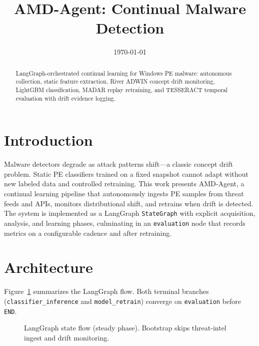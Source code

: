 \documentclass[11pt]{article}
\title{AMD-Agent: Continual Malware Detection}
\author{}
\date{\today}
\begin{document}
\maketitle

\begin{abstract}
LangGraph-orchestrated continual learning for Windows PE malware: autonomous collection, static feature extraction, River ADWIN concept drift monitoring, LightGBM classification, MADAR replay retraining, and TESSERACT temporal evaluation with drift evidence logging.
\end{abstract}

\section{Introduction}
Malware detectors degrade as attack patterns shift---a classic concept drift problem. Static PE classifiers trained on a fixed snapshot cannot adapt without new labeled data and controlled retraining. This work presents AMD-Agent, a continual learning pipeline that autonomously ingests PE samples from threat feeds and APIs, monitors distributional shift, and retrains when drift is detected. The system is implemented as a LangGraph \texttt{StateGraph} with explicit acquisition, analysis, and learning phases, culminating in an \texttt{evaluation} node that records metrics on a configurable cadence and after retraining.

\section{Architecture}
Figure~\ref{fig:flow} summarizes the LangGraph flow. Both terminal branches (\texttt{classifier\_inference} and \texttt{model\_retrain}) converge on \texttt{evaluation} before \texttt{END}.

\begin{figure}[h]
\centering
{}
\caption{LangGraph state flow (steady phase). Bootstrap skips threat-intel ingest and drift monitoring.}
\label{fig:flow}
\end{figure}
\end{document}
